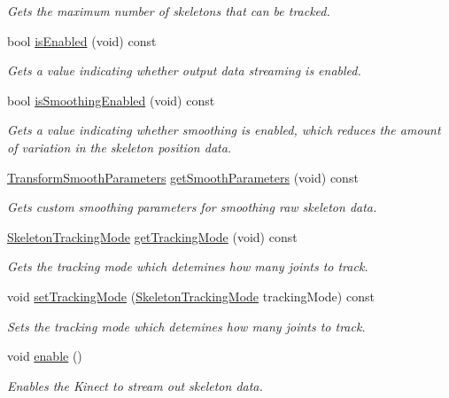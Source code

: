 \begin{DoxyCompactItemize}
\begin{DoxyCompactList}\small\item\em \-Gets the maximum number of skeletons that can be tracked. \end{DoxyCompactList}\item 
bool \hyperlink{class_skeleton_stream_af93d51f792d8f624aa297cffd52fc3bd}{is\-Enabled} (void) const 
\begin{DoxyCompactList}\small\item\em \-Gets a value indicating whether output data streaming is enabled. \end{DoxyCompactList}\item 
bool \hyperlink{class_skeleton_stream_a6dd909b0e543827e24fc5a8b5d808c0f}{is\-Smoothing\-Enabled} (void) const 
\begin{DoxyCompactList}\small\item\em \-Gets a value indicating whether smoothing is enabled, which reduces the amount of variation in the skeleton position data. \end{DoxyCompactList}\item 
\hyperlink{class_transform_smooth_parameters}{\-Transform\-Smooth\-Parameters} \hyperlink{class_skeleton_stream_a2e98eaad17a8a15275209a512d13535f}{get\-Smooth\-Parameters} (void) const 
\begin{DoxyCompactList}\small\item\em \-Gets custom smoothing parameters for smoothing raw skeleton data. \end{DoxyCompactList}\item 
\hyperlink{skeleton_tracking_mode_8h_a87402166ea87cd8993f36e03802e3742}{\-Skeleton\-Tracking\-Mode} \hyperlink{class_skeleton_stream_a263083a65b5e0d7534050ff63ae12af8}{get\-Tracking\-Mode} (void) const 
\begin{DoxyCompactList}\small\item\em \-Gets the tracking mode which detemines how many joints to track. \end{DoxyCompactList}\item 
void \hyperlink{class_skeleton_stream_a236384a51ff63af213e3d719218bbaa6}{set\-Tracking\-Mode} (\hyperlink{skeleton_tracking_mode_8h_a87402166ea87cd8993f36e03802e3742}{\-Skeleton\-Tracking\-Mode} tracking\-Mode) const 
\begin{DoxyCompactList}\small\item\em \-Sets the tracking mode which detemines how many joints to track. \end{DoxyCompactList}\item 
\hypertarget{class_skeleton_stream_a9dac265d95a15609ae695dfbbecc0916}{void \hyperlink{class_skeleton_stream_a9dac265d95a15609ae695dfbbecc0916}{enable} ()}\label{class_skeleton_stream_a9dac265d95a15609ae695dfbbecc0916}

\begin{DoxyCompactList}\small\item\em \-Enables the \-Kinect to stream out skeleton data. \end{DoxyCompactList}\end{DoxyCompactItemize}


